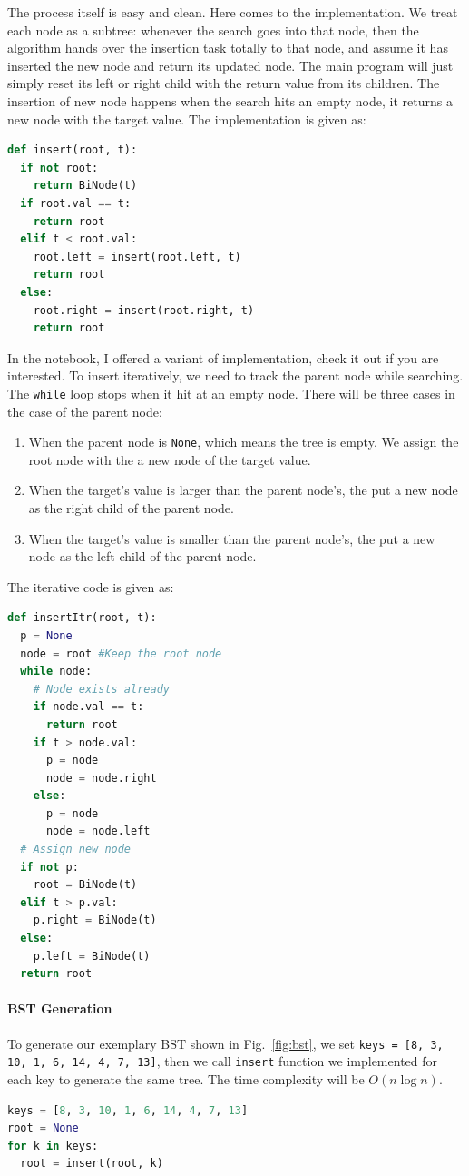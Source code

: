 \documentclass[main.tex]{subfiles}
\begin{document}
The process itself is easy and clean. Here comes to the implementation. We treat each node as a subtree: whenever the search goes into that node, then the algorithm hands over the insertion task totally to that node, and assume it has inserted the new node and return its updated node. The main program will just simply reset its left or right child with the return value from its children. The insertion of new node happens when the search hits an empty node, it returns a new node with the target value. The implementation is given as:
\begin{lstlisting}[language = Python]
def insert(root, t):
  if not root:
    return BiNode(t)
  if root.val == t:
    return root
  elif t < root.val:
    root.left = insert(root.left, t)
    return root
  else:
    root.right = insert(root.right, t) 
    return root
\end{lstlisting}
In the notebook, I offered a variant of implementation, check it out if you are interested. To insert iteratively, we need to track the parent node while searching. The \texttt{while} loop stops when it hit at an empty node.  There will be three cases in the case of the parent node:
\begin{enumerate}
    \item When the parent node is \texttt{None}, which means the tree is empty. We assign the root node with the a new node of the target value.
\item When the target's value is larger than the parent node's, the put a new node as the right child of the parent node.  
\item When the target's value is smaller than the parent node's, the put a new node as the left child of the parent node. 
\end{enumerate}
The iterative code is given as:
\begin{lstlisting}[language = Python]
def insertItr(root, t):
  p = None
  node = root #Keep the root node
  while node:
    # Node exists already
    if node.val == t:
      return root
    if t > node.val:
      p = node
      node = node.right
    else:
      p = node
      node = node.left
  # Assign new node
  if not p:
    root = BiNode(t)
  elif t > p.val:
    p.right = BiNode(t)
  else:
    p.left = BiNode(t)
  return root
\end{lstlisting}
\paragraph{BST Generation}
To generate our exemplary BST shown in Fig.~\ref{fig:bst}, we set \texttt{keys = [8, 3, 10, 1, 6, 14, 4, 7, 13]}, then we call \texttt{insert} function we implemented for each key to generate the same tree. The time complexity will be $O(n\log n)$.
\begin{lstlisting}[language=Python]
keys = [8, 3, 10, 1, 6, 14, 4, 7, 13]
root = None
for k in keys:
  root = insert(root, k)
\end{lstlisting}
\end{document}
